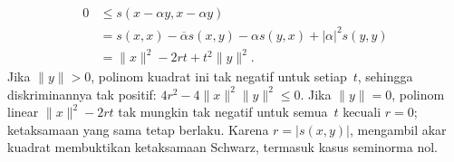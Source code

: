 \begin{o001readerwork}
\begin{o001proof}
\begin{align*}
0&\leq s(x-\alpha y,x-\alpha y)\\
 &=s(x,x)-\overline\alpha s(x,y)-\alpha s(y,x)
   +|\alpha|^2s(y,y)\\
 &=\|x\|^2-2rt+t^2\|y\|^2.
\end{align*}
Jika $\|y\|>0$, polinom kuadrat ini tak negatif untuk setiap~$t$, sehingga
diskriminannya tak positif:
$4r^2-4\|x\|^2\|y\|^2\leq0$. Jika $\|y\|=0$, polinom linear
$\|x\|^2-2rt$ tak mungkin tak negatif untuk semua~$t$ kecuali $r=0$;
ketaksamaan yang sama tetap berlaku. Karena $r=|s(x,y)|$, mengambil akar
kuadrat membuktikan ketaksamaan Schwarz, termasuk kasus seminorma nol.
\end{o001proof}
\end{o001readerwork}

